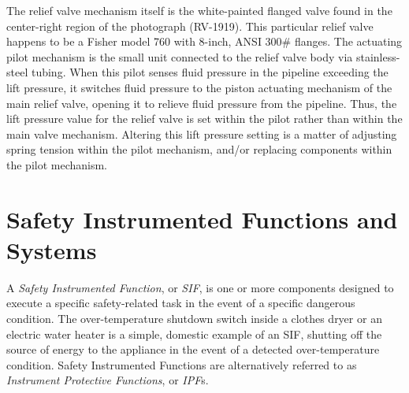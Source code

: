 The relief valve mechanism itself is the white-painted flanged valve found in the center-right region of the photograph (RV-1919).  This particular relief valve happens to be a Fisher model 760 with 8-inch, ANSI 300\# flanges.  The actuating pilot mechanism is the small unit connected to the relief valve body via stainless-steel tubing.  When this pilot senses fluid pressure in the pipeline exceeding the lift pressure, it switches fluid pressure to the piston actuating mechanism of the main relief valve, opening it to relieve fluid pressure from the pipeline.  Thus, the lift pressure value for the relief valve is set within the pilot rather than within the main valve mechanism.  Altering this lift pressure setting is a matter of adjusting spring tension within the pilot mechanism, and/or replacing components within the pilot mechanism.  











\filbreak
\section{Safety Instrumented Functions and Systems}

A \textit{Safety Instrumented Function}, or \textit{SIF}, is one or more components designed to execute a specific safety-related task in the event of a specific dangerous condition.  The over-temperature shutdown switch inside a clothes dryer or an electric water heater is a simple, domestic example of an SIF, shutting off the source of energy to the appliance in the event of a detected over-temperature condition.  Safety Instrumented Functions are alternatively referred to as \textit{Instrument Protective Functions}, or \textit{IPF}s.        

